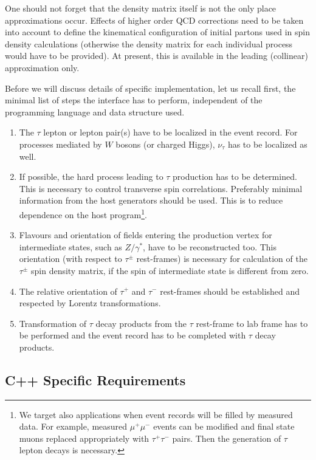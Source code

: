 \documentclass[]{Tauola_interface_design}
\begin{document}
One should not forget that the density matrix itself is not the only place
approximations occur.  Effects of higher 
order QCD 
corrections need to be taken into account to define the kinematical configuration 
of initial partons 
used in spin density calculations (otherwise the density matrix for each individual 
process would have to be provided). At present, this is available in the 
 leading (collinear) approximation only.

Before we will discuss details of  specific implementation, let us recall 
first, the minimal list of steps the interface has to perform, independent 
of the programming language and data structure used.

\begin{enumerate}
\item The $\tau$ lepton or lepton pair(s) have to be localized in the 
event record. For processes mediated by $W$ bosons (or charged Higgs), 
 $\nu_\tau$ has to be localized as well.
\item
 If possible, the hard process leading to $\tau$ production has to be 
determined. This is necessary to control  transverse spin correlations.
Preferably minimal information from the host 
generators should be used. This is to reduce dependence on the host program\footnote{We 
target also applications when  event records will be filled by 
measured data. For example, 
measured $\mu^+ \mu^-$ events can be modified and final state muons replaced 
appropriately with $\tau^+ \tau^-$ pairs. Then the generation of $\tau$ lepton decays is necessary.}.
\item Flavours and orientation of fields entering the production vertex for intermediate states, such as 
$Z/\gamma^*$, 
 have to be reconstructed too. This orientation (with respect to $\tau^\pm$ 
rest-frames) is necessary for calculation of the $\tau^\pm$ spin density matrix,
if the spin of intermediate state is different from zero. 
\item The relative orientation of  $\tau^+$ and $\tau^-$ rest-frames 
should be established and respected by Lorentz transformations. 
\item Transformation of $\tau$ decay products from the $\tau$ rest-frame to 
lab frame has to be performed and the event record has to be completed  with $\tau$ decay products.
\end{enumerate}


\subsection{C++ Specific Requirements}
\end{document}
